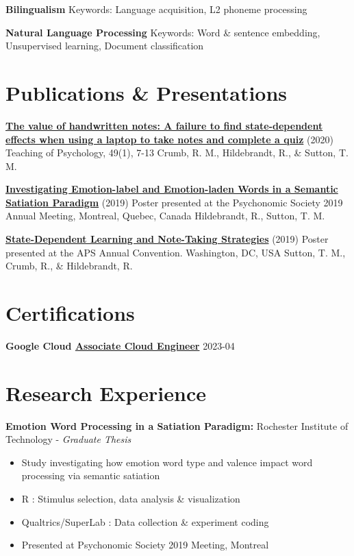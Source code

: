 \documentclass[a4paper,9pt]{extarticle}
\begin{document}
\noindent
\textbf{Bilingualism}
Keywords: Language acquisition, L2 phoneme processing

\noindent
\textbf{Natural Language Processing}
Keywords: Word \& sentence embedding, Unsupervised learning, Document classification

\section*{Publications \& Presentations}

\noindent
\textbf{\href{http://dx.doi.org/10.1177/0098628320979895}{The value of handwritten notes: A failure to find state-dependent effects when using a laptop to take notes and complete a quiz}} (2020)
Teaching of Psychology, 49(1), 7-13
Crumb, R. M., Hildebrandt, R., \& Sutton, T. M.

\noindent
\textbf{\href{}{Investigating Emotion-label and Emotion-laden Words in a Semantic Satiation Paradigm}} (2019)
Poster presented at the Psychonomic Society 2019 Annual Meeting, Montreal, Quebec, Canada
Hildebrandt, R., Sutton, T. M.

\noindent
\textbf{\href{}{State-Dependent Learning and Note-Taking Strategies}} (2019)
Poster presented at the APS Annual Convention. Washington, DC, USA
Sutton, T. M., Crumb, R., \& Hildebrandt, R.

\section*{Certifications}

\noindent
\textbf{Google Cloud \href{https://google.accredible.com/d3ef369f-9c2c-486a-bda6-943a74f70dff}{Associate Cloud Engineer}} \hfill 2023-04

\section*{Research Experience}

\noindent
\textbf{Emotion Word Processing in a Satiation Paradigm:}
Rochester Institute of Technology - \textit{Graduate Thesis}
\begin{itemize}
\item Study investigating how emotion word type and valence impact word processing via semantic satiation
\item R : Stimulus selection, data analysis \& visualization
\item Qualtrics/SuperLab : Data collection \& experiment coding
\item Presented at Psychonomic Society 2019 Meeting, Montreal
\end{itemize}
\end{document}
